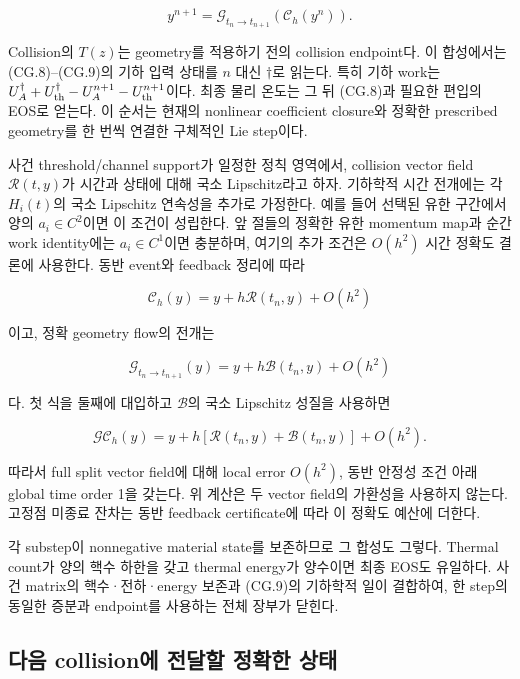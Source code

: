 \[
\boxed{
y^{n+1}
=\mathcal G_{t_n\to t_{n+1}}\!\left(\mathcal C_h(y^n)\right).
}
\tag{CG.10}
\]

Collision의 \(T(z)\)는 geometry를 적용하기 전의 collision endpoint다. 이 합성에서는 (CG.8)--(CG.9)의 기하 입력 상태를 \(n\) 대신 \(\dagger\)로 읽는다. 특히 기하 work는 \(U_A^\dagger+U_{\rm th}^\dagger-U_A^{n+1}-U_{\rm th}^{n+1}\)이다. 최종 물리 온도는 그 뒤 (CG.8)과 필요한 편입의 EOS로 얻는다. 이 순서는 현재의 nonlinear coefficient closure와 정확한 prescribed geometry를 한 번씩 연결한 구체적인 Lie step이다.

사건 threshold/channel support가 일정한 정칙 영역에서, collision vector field \(\mathcal R(t,y)\)가 시간과 상태에 대해 국소 Lipschitz라고 하자. 기하학적 시간 전개에는 각 \(H_i(t)\)의 국소 Lipschitz 연속성을 추가로 가정한다. 예를 들어 선택된 유한 구간에서 양의 \(a_i\in C^2\)이면 이 조건이 성립한다. 앞 절들의 정확한 유한 momentum map과 순간 work identity에는 \(a_i\in C^1\)이면 충분하며, 여기의 추가 조건은 \(O(h^2)\) 시간 정확도 결론에 사용한다. 동반 event와 feedback 정리에 따라

\[
\mathcal C_h(y)=y+h\mathcal R(t_n,y)+O(h^2)
\]

이고, 정확 geometry flow의 전개는

\[
\mathcal G_{t_n\to t_{n+1}}(y)
=y+h\mathcal B(t_n,y)+O(h^2)
\]

다. 첫 식을 둘째에 대입하고 \(\mathcal B\)의 국소 Lipschitz 성질을 사용하면

\[
\mathcal G\mathcal C_h(y)
=y+h[\mathcal R(t_n,y)+\mathcal B(t_n,y)]+O(h^2).
\tag{CG.11}
\]

따라서 full split vector field에 대해 local error \(O(h^2)\), 동반 안정성 조건 아래 global time order 1을 갖는다. 위 계산은 두 vector field의 가환성을 사용하지 않는다. 고정점 미종료 잔차는 동반 feedback certificate에 따라 이 정확도 예산에 더한다.

각 substep이 nonnegative material state를 보존하므로 그 합성도 그렇다. Thermal count가 양의 핵수 하한을 갖고 thermal energy가 양수이면 최종 EOS도 유일하다. 사건 matrix의 핵수·전하·energy 보존과 (CG.9)의 기하학적 일이 결합하여, 한 step의 동일한 증분과 endpoint를 사용하는 전체 장부가 닫힌다.

\hypertarget{uxb2e4uxc74c-collisionuxc5d0-uxc804uxb2ecuxd560-uxc815uxd655uxd55c-uxc0c1uxd0dc}{%
\subsection{다음 collision에 전달할 정확한 상태}\label{uxb2e4uxc74c-collisionuxc5d0-uxc804uxb2ecuxd560-uxc815uxd655uxd55c-uxc0c1uxd0dc}}

